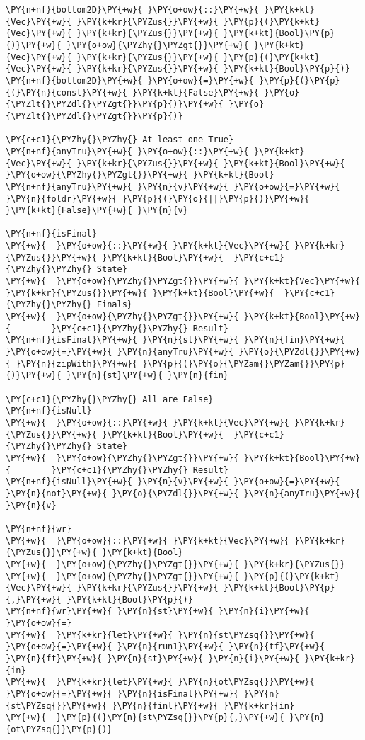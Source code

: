 {\begin{Verbatim}[commandchars=\\\{\}]
\PY{n+nf}{bottom2D}\PY{+w}{ }\PY{o+ow}{::}\PY{+w}{ }\PY{k+kt}{Vec}\PY{+w}{ }\PY{k+kr}{\PYZus{}}\PY{+w}{ }\PY{p}{(}\PY{k+kt}{Vec}\PY{+w}{ }\PY{k+kr}{\PYZus{}}\PY{+w}{ }\PY{k+kt}{Bool}\PY{p}{)}\PY{+w}{ }\PY{o+ow}{\PYZhy{}\PYZgt{}}\PY{+w}{ }\PY{k+kt}{Vec}\PY{+w}{ }\PY{k+kr}{\PYZus{}}\PY{+w}{ }\PY{p}{(}\PY{k+kt}{Vec}\PY{+w}{ }\PY{k+kr}{\PYZus{}}\PY{+w}{ }\PY{k+kt}{Bool}\PY{p}{)}
\PY{n+nf}{bottom2D}\PY{+w}{ }\PY{o+ow}{=}\PY{+w}{ }\PY{p}{(}\PY{p}{(}\PY{n}{const}\PY{+w}{ }\PY{k+kt}{False}\PY{+w}{ }\PY{o}{\PYZlt{}\PYZdl{}\PYZgt{}}\PY{p}{)}\PY{+w}{ }\PY{o}{\PYZlt{}\PYZdl{}\PYZgt{}}\PY{p}{)}

\PY{c+c1}{\PYZhy{}\PYZhy{} At least one True}
\PY{n+nf}{anyTru}\PY{+w}{ }\PY{o+ow}{::}\PY{+w}{ }\PY{k+kt}{Vec}\PY{+w}{ }\PY{k+kr}{\PYZus{}}\PY{+w}{ }\PY{k+kt}{Bool}\PY{+w}{ }\PY{o+ow}{\PYZhy{}\PYZgt{}}\PY{+w}{ }\PY{k+kt}{Bool}
\PY{n+nf}{anyTru}\PY{+w}{ }\PY{n}{v}\PY{+w}{ }\PY{o+ow}{=}\PY{+w}{ }\PY{n}{foldr}\PY{+w}{ }\PY{p}{(}\PY{o}{||}\PY{p}{)}\PY{+w}{ }\PY{k+kt}{False}\PY{+w}{ }\PY{n}{v}

\PY{n+nf}{isFinal}
\PY{+w}{  }\PY{o+ow}{::}\PY{+w}{ }\PY{k+kt}{Vec}\PY{+w}{ }\PY{k+kr}{\PYZus{}}\PY{+w}{ }\PY{k+kt}{Bool}\PY{+w}{  }\PY{c+c1}{\PYZhy{}\PYZhy{} State}
\PY{+w}{  }\PY{o+ow}{\PYZhy{}\PYZgt{}}\PY{+w}{ }\PY{k+kt}{Vec}\PY{+w}{ }\PY{k+kr}{\PYZus{}}\PY{+w}{ }\PY{k+kt}{Bool}\PY{+w}{  }\PY{c+c1}{\PYZhy{}\PYZhy{} Finals}
\PY{+w}{  }\PY{o+ow}{\PYZhy{}\PYZgt{}}\PY{+w}{ }\PY{k+kt}{Bool}\PY{+w}{        }\PY{c+c1}{\PYZhy{}\PYZhy{} Result}
\PY{n+nf}{isFinal}\PY{+w}{ }\PY{n}{st}\PY{+w}{ }\PY{n}{fin}\PY{+w}{ }\PY{o+ow}{=}\PY{+w}{ }\PY{n}{anyTru}\PY{+w}{ }\PY{o}{\PYZdl{}}\PY{+w}{ }\PY{n}{zipWith}\PY{+w}{ }\PY{p}{(}\PY{o}{\PYZam{}\PYZam{}}\PY{p}{)}\PY{+w}{ }\PY{n}{st}\PY{+w}{ }\PY{n}{fin}

\PY{c+c1}{\PYZhy{}\PYZhy{} All are False}
\PY{n+nf}{isNull}
\PY{+w}{  }\PY{o+ow}{::}\PY{+w}{ }\PY{k+kt}{Vec}\PY{+w}{ }\PY{k+kr}{\PYZus{}}\PY{+w}{ }\PY{k+kt}{Bool}\PY{+w}{  }\PY{c+c1}{\PYZhy{}\PYZhy{} State}
\PY{+w}{  }\PY{o+ow}{\PYZhy{}\PYZgt{}}\PY{+w}{ }\PY{k+kt}{Bool}\PY{+w}{        }\PY{c+c1}{\PYZhy{}\PYZhy{} Result}
\PY{n+nf}{isNull}\PY{+w}{ }\PY{n}{v}\PY{+w}{ }\PY{o+ow}{=}\PY{+w}{ }\PY{n}{not}\PY{+w}{ }\PY{o}{\PYZdl{}}\PY{+w}{ }\PY{n}{anyTru}\PY{+w}{ }\PY{n}{v}

\PY{n+nf}{wr}
\PY{+w}{  }\PY{o+ow}{::}\PY{+w}{ }\PY{k+kt}{Vec}\PY{+w}{ }\PY{k+kr}{\PYZus{}}\PY{+w}{ }\PY{k+kt}{Bool}
\PY{+w}{  }\PY{o+ow}{\PYZhy{}\PYZgt{}}\PY{+w}{ }\PY{k+kr}{\PYZus{}}
\PY{+w}{  }\PY{o+ow}{\PYZhy{}\PYZgt{}}\PY{+w}{ }\PY{p}{(}\PY{k+kt}{Vec}\PY{+w}{ }\PY{k+kr}{\PYZus{}}\PY{+w}{ }\PY{k+kt}{Bool}\PY{p}{,}\PY{+w}{ }\PY{k+kt}{Bool}\PY{p}{)}
\PY{n+nf}{wr}\PY{+w}{ }\PY{n}{st}\PY{+w}{ }\PY{n}{i}\PY{+w}{ }\PY{o+ow}{=}
\PY{+w}{  }\PY{k+kr}{let}\PY{+w}{ }\PY{n}{st\PYZsq{}}\PY{+w}{ }\PY{o+ow}{=}\PY{+w}{ }\PY{n}{run1}\PY{+w}{ }\PY{n}{tf}\PY{+w}{ }\PY{n}{ft}\PY{+w}{ }\PY{n}{st}\PY{+w}{ }\PY{n}{i}\PY{+w}{ }\PY{k+kr}{in}
\PY{+w}{  }\PY{k+kr}{let}\PY{+w}{ }\PY{n}{ot\PYZsq{}}\PY{+w}{ }\PY{o+ow}{=}\PY{+w}{ }\PY{n}{isFinal}\PY{+w}{ }\PY{n}{st\PYZsq{}}\PY{+w}{ }\PY{n}{finl}\PY{+w}{ }\PY{k+kr}{in}
\PY{+w}{  }\PY{p}{(}\PY{n}{st\PYZsq{}}\PY{p}{,}\PY{+w}{ }\PY{n}{ot\PYZsq{}}\PY{p}{)}


\end{Verbatim}}
